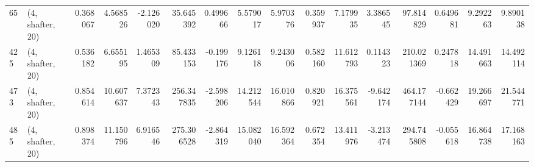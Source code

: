 \begin{tabular}{llrrrrrrrrrrrrrr}
65  &  (4, shafter, 20) &   0.368067 &   4.568526 &  -2.126020 &    35.645392 &   0.499666 &   5.579017 &   5.970376 &  0.359937 &   7.179935 &   3.386545 &     97.814829 &    0.649681 &    9.292263 &    9.890138 \\
425 &  (4, shafter, 20) &   0.536182 &   6.655195 &   1.465309 &    85.433153 &  -0.199176 &   9.126118 &   9.243006 &  0.582160 &  11.612793 &   0.114323 &    210.021369 &    0.247818 &   14.491663 &   14.492114 \\
473 &  (4, shafter, 20) &   0.854614 &  10.607637 &   7.372343 &   256.347835 &  -2.598206 &  14.212544 &  16.010866 &  0.820921 &  16.375561 &  -9.642174 &    464.177144 &   -0.662429 &   19.266697 &   21.544771 \\
485 &  (4, shafter, 20) &   0.898374 &  11.150796 &   6.916546 &   275.306528 &  -2.864319 &  15.082040 &  16.592364 &  0.672354 &  13.411976 &  -3.213474 &    294.745808 &   -0.055618 &   16.864738 &   17.168163 \\
\bottomrule
\end{tabular}

